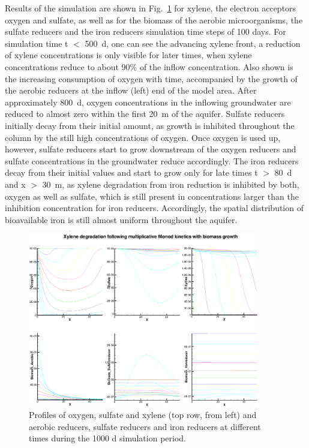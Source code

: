Results of the simulation are shown in Fig.~\ref{profiles_xylene_degradation} for xylene, the electron acceptors oxygen and sulfate, as well as for the biomass of the aerobic microorganisms, the sulfate reducers and the iron reducers simulation time steps of 100 days.
For simulation time t $<$ 500~d, one can see the advancing xylene front, a reduction of xylene concentrations is only visible for later times, when xylene concentrations reduce to about 90\% of the inflow concentration. Also shown is the increasing consumption of oxygen with time, accompanied by the growth of the aerobic reducers at the inflow (left) end of the model area. After approximately 800~d, oxygen concentrations in the inflowing groundwater are reduced to almost zero within the first 20~m of the aquifer. Sulfate reducers initially decay from their initial amount, as growth is inhibited throughout the column by the still high concentrations of oxygen. Once oxygen is used up, however, sulfate reducers start to grow downstream of the oxygen reducers and sulfate concentrations in the groundwater reduce accordingly. The iron reducers decay from their initial values and start to grow only for late times t $>$ 80~d and x $>$ 30~m, as xylene degradation from iron reduction is inhibited by both, oxygen as well as sulfate, which is still present in concentrations larger than the inhibition concentration for iron reducers. Accordingly, the spatial distribution of bioavailable iron is still almost uniform throughout the aquifer.


\begin{figure}[htbp]
\centering
\includegraphics[width=0.9\textwidth]{C/figures/profiles_xylene_degradation.eps}
\caption{Profiles of oxygen, sulfate and xylene (top row, from left) and  aerobic reducers, sulfate reducers and iron reducers at different times during the 1000 d simulation period.}
\label{profiles_xylene_degradation}
\end{figure}


